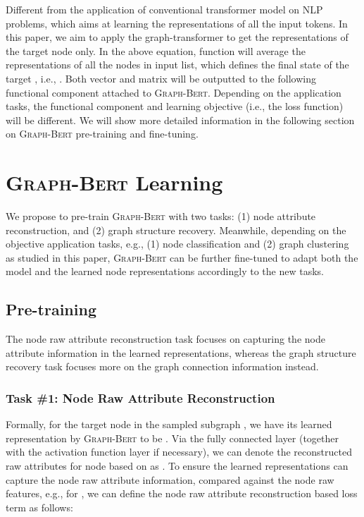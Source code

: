 \documentclass{article}
\newcommand{\our}{\textsc{Graph-Bert}}
\begin{document}
Different from the application of conventional transformer model on NLP problems, which aims at learning the representations of all the input tokens. In this paper, we aim to apply the graph-transformer to get the representations of the target node only. In the above equation, function  will average the representations of all the nodes in input list, which defines the final state of the target , i.e., . Both vector  and matrix  will be outputted to the following functional component attached to {\our}. Depending on the application tasks, the functional component and learning objective (i.e., the loss function) will be different. We will show more detailed information in the following section on {\our} pre-training and fine-tuning.



\section{{\our} Learning}\label{sec:analysis}

We propose to pre-train {\our} with two tasks: (1) node attribute reconstruction, and (2) graph structure recovery. Meanwhile, depending on the objective application tasks, e.g., (1) node classification and (2) graph clustering as studied in this paper, {\our} can be further fine-tuned to adapt both the model and the learned node representations accordingly to the new tasks.

\subsection{Pre-training}

The node raw attribute reconstruction task focuses on capturing the node attribute information in the learned representations, whereas the graph structure recovery task focuses more on the graph connection information instead.

\subsubsection{Task \#1: Node Raw Attribute Reconstruction}

Formally, for the target node  in the sampled subgraph , we have its learned representation by {\our} to be . Via the fully connected layer (together with the activation function layer if necessary), we can denote the reconstructed raw attributes for node  based on  as . To ensure the learned representations can capture the node raw attribute information, compared against the node raw features, e.g.,  for , we can define the node raw attribute reconstruction based loss term as follows:
\end{document}
